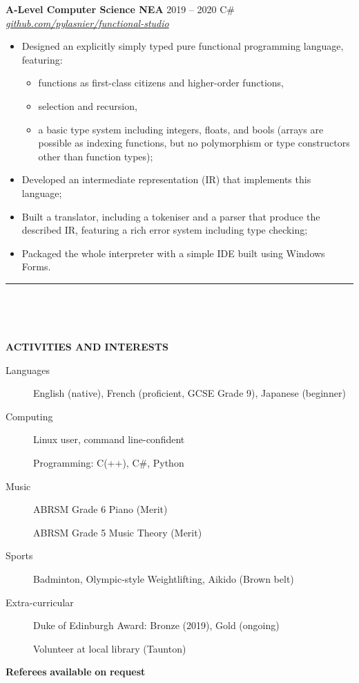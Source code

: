\documentclass[
  11pt,
  a4paper,
]{article}
\providecommand{\tightlist}{%
  \setlength{\itemsep}{0pt}\setlength{\parskip}{0pt}}
\newcommand{\itemspace}{0.8ex}
\newcommand{\ruledheader}[2]{%
\begingroup
\setlength{\fboxsep}{0pt}%
\colorbox{#1}{%
\parbox[b][1.2ex][t]{35mm}{\begin{tiny}\ \end{tiny}}}%
\parbox[b][1.2ex][t]{5mm}{\begin{tiny}\ \end{tiny}}%
\uppercase{\textbf{#2}}
\endgroup}
\begin{document}
\vspace{\itemspace}

\textbf{A-Level Computer Science NEA} \textbar{} 2019 -- 2020 \textbar{}
C\# \textbar{}
\href{https://github.com/pylasnier/functional-studio}{\emph{github.com/pylasnier/functional-studio}}

\begin{itemize}
\tightlist
\item
  Designed an explicitly simply typed pure functional programming
  language, featuring:

  \begin{itemize}
  \tightlist
  \item
    functions as first-class citizens and higher-order functions,
  \item
    selection and recursion,
  \item
    a basic type system including integers, floats, and bools (arrays
    are possible as indexing functions, but no polymorphism or type
    constructors other than function types);
  \end{itemize}
\item
  Developed an intermediate representation (IR) that implements this
  language;
\item
  Built a translator, including a tokeniser and a parser that produce
  the described IR, featuring a rich error system including type
  checking;
\item
  Packaged the whole interpreter with a simple IDE built using Windows
  Forms.
\end{itemize}

\begin{Large}

\vspace{-1.5ex}\rule{\textwidth}{0.8pt}\vspace{2ex}

\ruledheader{cyan!50!teal}{Activities and Interests}\end{Large}

\vspace{\itemspace}

\begin{description}
\item[Languages]
English (native), French (proficient, GCSE Grade 9), Japanese (beginner)
\item[Computing]
Linux user, command line-confident

Programming: C(++), C\#, Python
\item[Music]
ABRSM Grade 6 Piano (Merit)

ABRSM Grade 5 Music Theory (Merit)
\item[Sports]
Badminton, Olympic-style Weightlifting, Aikido (Brown belt)
\item[Extra-curricular]
Duke of Edinburgh Award: Bronze (2019), Gold (ongoing)

Volunteer at local library (Taunton)
\end{description}

\vspace{2.0ex}\begin{center}

\textbf{Referees} \textbf{available} \textbf{on} \textbf{request}

\end{center}
\end{document}
